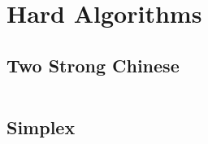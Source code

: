 \section{Hard Algorithms}

\subsection{Two Strong Chinese}

\inputminted{cpp}{\code/2_strong_chinese_answer.cpp}

\subsection{Simplex}

\inputminted{cpp}{\code/simplex20.cpp}
